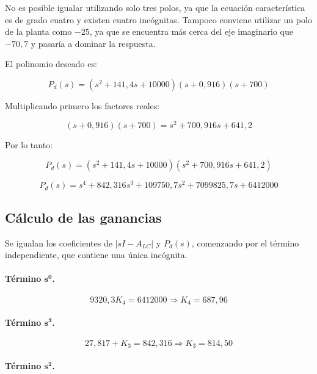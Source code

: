 \documentclass[12pt,a4paper]{article}
\begin{document}
No es posible igualar utilizando solo tres polos, ya que la ecuación característica es de grado cuatro y existen cuatro incógnitas. Tampoco conviene utilizar un polo de la planta como $-25$, ya que se encuentra más cerca del eje imaginario que $-70{,}7$ y pasaría a dominar la respuesta.

El polinomio deseado es:

\begin{equation}P_d(s)=(s^2+141{,}4s+10000)(s+0{,}916)(s+700)\end{equation}

Multiplicando primero los factores reales:

\begin{equation}(s+0{,}916)(s+700)=s^2+700{,}916s+641{,}2\end{equation}

Por lo tanto:

\begin{equation}P_d(s)=(s^2+141{,}4s+10000)(s^2+700{,}916s+641{,}2)\end{equation}

\begin{equation}\boxed{P_d(s)=s^4+842{,}316s^3+109750{,}7s^2+7099825{,}7s+6412000}\end{equation}
\subsection*{Cálculo de las ganancias}
Se igualan los coeficientes de $|sI-A_{LC}|$ y $P_d(s)$, comenzando por el término independiente, que contiene una única incógnita.
\paragraph{Término $\boldsymbol{s^0}$.}

\begin{equation}9320{,}3K_4=6412000\Rightarrow\boxed{K_4=687{,}96}\end{equation}
\paragraph{Término $\boldsymbol{s^3}$.}

\begin{equation}27{,}817+K_3=842{,}316\Rightarrow\boxed{K_3=814{,}50}\end{equation}
\paragraph{Término $\boldsymbol{s^2}$.}
\end{document}
